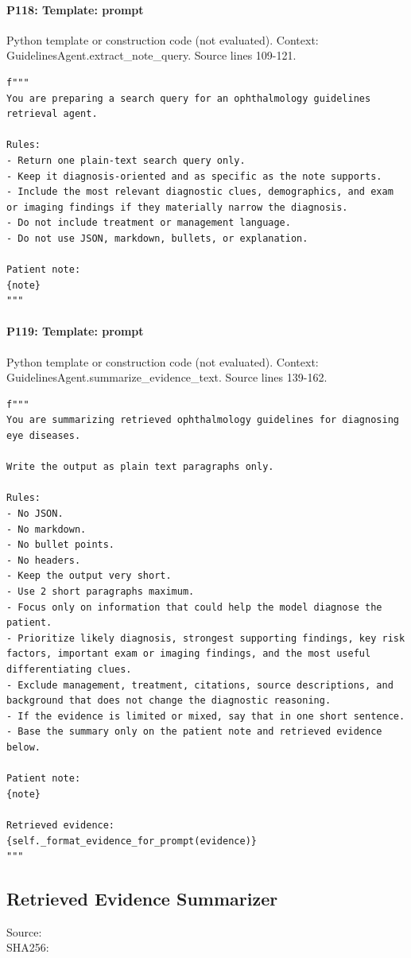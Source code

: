 \documentclass[10pt]{article}
\begin{document}
\paragraph{P118: Template: prompt}
Python template or construction code (not evaluated). Context: GuidelinesAgent.extract\_note\_query. Source lines 109-121.
\begin{Verbatim}
f"""
You are preparing a search query for an ophthalmology guidelines retrieval agent.

Rules:
- Return one plain-text search query only.
- Keep it diagnosis-oriented and as specific as the note supports.
- Include the most relevant diagnostic clues, demographics, and exam or imaging findings if they materially narrow the diagnosis.
- Do not include treatment or management language.
- Do not use JSON, markdown, bullets, or explanation.

Patient note:
{note}
"""
\end{Verbatim}
\paragraph{P119: Template: prompt}
Python template or construction code (not evaluated). Context: GuidelinesAgent.summarize\_evidence\_text. Source lines 139-162.
\begin{Verbatim}
f"""
You are summarizing retrieved ophthalmology guidelines for diagnosing eye diseases.

Write the output as plain text paragraphs only.

Rules:
- No JSON.
- No markdown.
- No bullet points.
- No headers.
- Keep the output very short.
- Use 2 short paragraphs maximum.
- Focus only on information that could help the model diagnose the patient.
- Prioritize likely diagnosis, strongest supporting findings, key risk factors, important exam or imaging findings, and the most useful differentiating clues.
- Exclude management, treatment, citations, source descriptions, and background that does not change the diagnostic reasoning.
- If the evidence is limited or mixed, say that in one short sentence.
- Base the summary only on the patient note and retrieved evidence below.

Patient note:
{note}

Retrieved evidence:
{self._format_evidence_for_prompt(evidence)}
"""
\end{Verbatim}
\subsection{Retrieved Evidence Summarizer}
Source: \\
SHA256: {\scriptsize{}}
\end{document}
